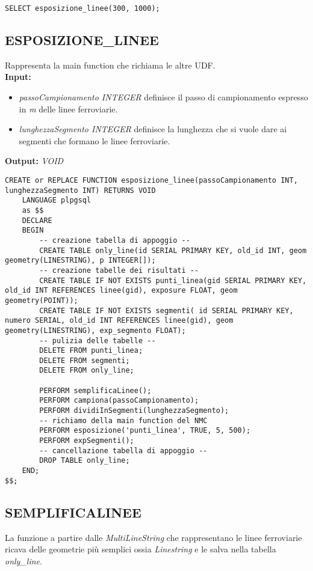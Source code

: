 \begin{lstlisting}[style=mySQL]
SELECT esposizione_linee(300, 1000);
\end{lstlisting}     

\subsection{\textbf{ESPOSIZIONE\_LINEE}}
Rappresenta la main function che richiama le altre UDF.\\
\textbf{Input:} 
\begin{itemize}
\item \textit{passoCampionamento INTEGER} definisce il passo di campionamento espresso in \textit{m} delle linee ferroviarie.
\item \textit{lunghezzaSegmento INTEGER} definisce la lunghezza che si vuole dare ai segmenti che formano le linee ferroviarie.
\end{itemize}
\textbf{Output:} \textit{VOID} 

\begin{lstlisting}[style=mySQL]
CREATE or REPLACE FUNCTION esposizione_linee(passoCampionamento INT, lunghezzaSegmento INT) RETURNS VOID
	LANGUAGE plpgsql
	as $$
	DECLARE
	BEGIN
		-- creazione tabella di appoggio --
		CREATE TABLE only_line(id SERIAL PRIMARY KEY, old_id INT, geom geometry(LINESTRING), p INTEGER[]);
		-- creazione tabelle dei risultati --
		CREATE TABLE IF NOT EXISTS punti_linea(gid SERIAL PRIMARY KEY, old_id INT REFERENCES linee(gid), exposure FLOAT, geom geometry(POINT));
		CREATE TABLE IF NOT EXISTS segmenti( id SERIAL PRIMARY KEY, numero SERIAL, old_id INT REFERENCES linee(gid), geom geometry(LINESTRING), exp_segmento FLOAT);
		-- pulizia delle tabelle --
		DELETE FROM punti_linea;
		DELETE FROM segmenti;
		DELETE FROM only_line;
		
		PERFORM semplificaLinee();
		PERFORM campiona(passoCampionamento);
		PERFORM dividiInSegmenti(lunghezzaSegmento);
		-- richiamo della main function del NMC
		PERFORM esposizione('punti_linea', TRUE, 5, 500);
		PERFORM expSegmenti();
		-- cancellazione tabella di appoggio --
		DROP TABLE only_line;
	END;
$$;
\end{lstlisting}

\subsection{\textbf{SEMPLIFICALINEE}}
La funzione a partire dalle \textit{MultiLineString} che rappresentano le linee ferroviarie ricava delle geometrie più semplici ossia \textit{Linestring} e le salva nella tabella \textit{only\_line}.\\


